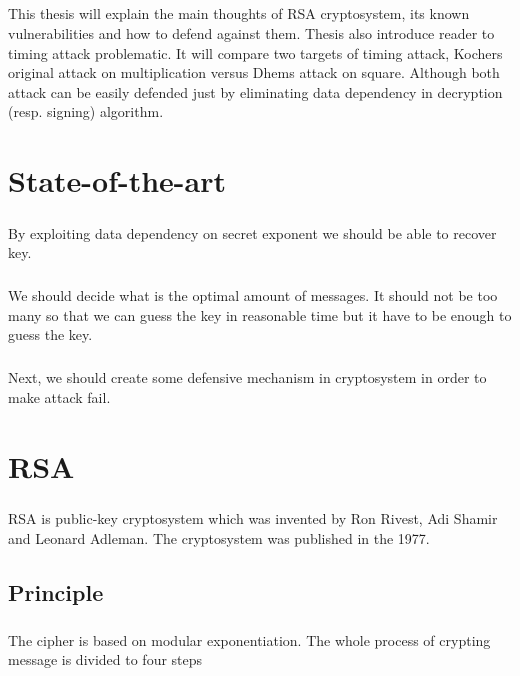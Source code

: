 \documentclass[thesis=B,english]{FITthesis}[2012/10/20]
\begin{document}
\paragraph*{}
{This thesis will explain the main thoughts of RSA cryptosystem, its known vulnerabilities and how to defend against them. Thesis also introduce reader to timing attack problematic.
It will compare two targets of timing attack, Kochers original attack on multiplication versus Dhems attack on square. Although both attack can be easily defended just by eliminating
data dependency in decryption (resp. signing) algorithm.




\pagestyle{ruled}
\chapter{State-of-the-art}
\paragraph*{}{
By exploiting data dependency on secret exponent we should be able to recover key.
}
\paragraph*{}{
We should decide what is the optimal amount of messages. It should not be too many so that we can guess the key in reasonable time but it have to be enough to guess the key.
}
\paragraph*{}{
Next, we should create some defensive mechanism in cryptosystem in order to make attack fail.
}


\chapter{RSA}

\paragraph*{}
{RSA is public-key cryptosystem which was invented by Ron Rivest, Adi Shamir and Leonard Adleman. The cryptosystem was published in the 1977.}


\section{Principle}
\paragraph*{}
{The cipher is based on modular exponentiation. The whole process of crypting message is divided to four steps}

}
\end{document}
